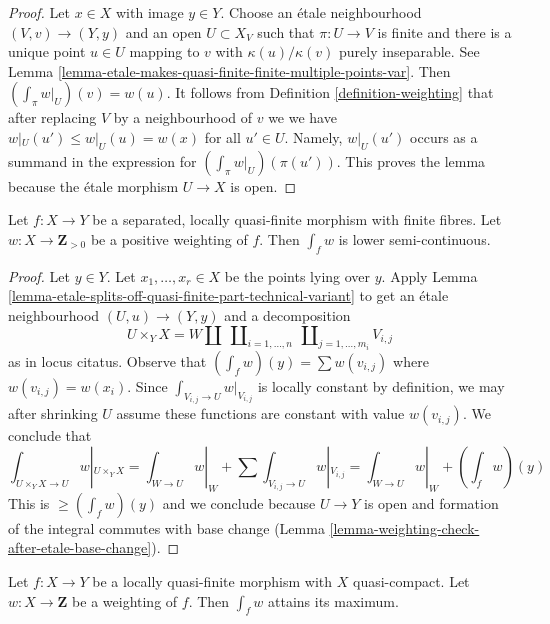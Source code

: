 \begin{proof}
Let $x \in X$ with image $y \in Y$. Choose an \'etale neighbourhood
$(V, v) \to (Y, y)$ and an open $U \subset X_V$ such that
$\pi : U \to V$ is finite and there is a unique point $u \in U$
mapping to $v$ with $\kappa(u)/\kappa(v)$ purely inseparable.
See Lemma \ref{lemma-etale-makes-quasi-finite-finite-multiple-points-var}.
Then $(\int_\pi w|_U)(v) = w(u)$.
It follows from Definition \ref{definition-weighting}
that after replacing $V$ by a neighbourhood of $v$ we
we have $w|_U(u') \leq w|_U(u) = w(x)$ for all $u' \in U$.
Namely, $w|_U(u')$ occurs as a summand in the expression
for $(\int_\pi w|_U)(\pi(u'))$.
This proves the lemma because the \'etale morphism
$U \to X$ is open.
\end{proof}

\begin{lemma}
\label{lemma-semicontinuous-int-w}
Let $f : X \to Y$ be a separated, locally quasi-finite morphism
with finite fibres.
Let $w : X \to \mathbf{Z}_{> 0}$ be a positive weighting of $f$.
Then $\int_f w$ is lower semi-continuous.
\end{lemma}

\begin{proof}
Let $y \in Y$. Let $x_1, \ldots, x_r \in X$ be the points lying over $y$.
Apply
Lemma \ref{lemma-etale-splits-off-quasi-finite-part-technical-variant}
to get an \'etale neighbourhood $(U, u) \to (Y, y)$ and a decomposition
$$
U \times_Y X =
W \amalg
\ \coprod\nolimits_{i = 1, \ldots, n}
\ \coprod\nolimits_{j = 1, \ldots, m_i}
V_{i, j}
$$
as in locus citatus. Observe that $(\int_f w)(y) = \sum w(v_{i, j})$
where $w(v_{i, j}) = w(x_i)$. Since $\int_{V_{i, j} \to U} w|_{V_{i, j}}$
is locally constant by definition, we may after shrinking $U$
assume these functions are constant with value $w(v_{i, j})$.
We conclude that
$$
\textstyle{\int}_{U \times_Y X \to U} w|_{U \times_Y X} =
\textstyle{\int}_{W \to U} w|_W +
\sum \textstyle{\int}_{V_{i, j} \to U} w|_{V_{i, j}} =
\textstyle{\int}_{W \to U} w|_W + (\int_f w)(y)
$$
This is $\geq (\int_f w)(y)$ and we conclude because $U \to Y$
is open and formation of the integral commutes with base change
(Lemma \ref{lemma-weighting-check-after-etale-base-change}).
\end{proof}

\begin{lemma}
\label{lemma-max-int-w}
Let $f : X \to Y$ be a locally quasi-finite morphism
with $X$ quasi-compact. Let $w : X \to \mathbf{Z}$ be a weighting of $f$.
Then $\int_f w$ attains its maximum.
\end{lemma}

